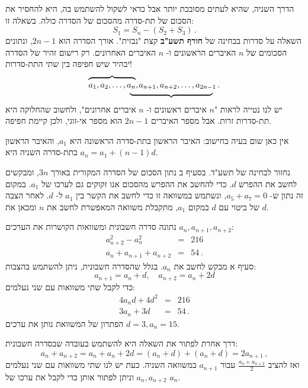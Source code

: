 \documentclass[12pt,a4paper]{article}
\begin{document}
הדרך השניה, שהיא לעתים מסובכת יותר אבל כדאי לשקול להשתמש בה, היא להחסיר את הסכום של תת-סדרה מהסכום של הסדרה כולה. בשאלה זו:
\[
S_1 = S_n - (S_2+S_3)\,.
\]
השאלה על סדרות בבחינה של
\textbf{חורף תשע"ב}
קצת "נבזית". אורך הסדרה הוא
$2n-1$,
ונתונים הסכומים של
$n$
האיברים הראשונים ו-%
$n$
האיברים האחרונים. רק רישום זהיר של הסדרה יבהיר שיש חפיפה בין שתי התת-סדרות!
\[
\renewcommand{\arraystretch}{.4}
\begin{array}{ll}
\overbrace{\rule{0pt}{8pt}a_1, a_2, \ldots, a_n},&\hspace{-9pt}a_{n+1}, a_{n+2}, \ldots, a_{2n-1}\,.\\
&\hspace{-2em}\underbrace{\rule{10em}{0pt}}
\end{array}
\]
יש לנו נטייה לראות 
"$n$
איברים ראשונים ו-%
$n$
איברים אחרונים", ולחשוב שהחלוקה היא תת-סדרות זרות. אבל מספר האיברים
$2n-1$
הוא מספר אי-זוגי, ולכן קיימת חפיפה.

אין כאן שום בעיה בחישוב: האיבר הראשון בתת-סדרה הראשונה היא
$a_1$,
והאיבר הראשון בתת-סדרה השניה היא
$a_n=a_1+(n-1)d$.

נחזור לבחינה של תשע"ד. בסעיף ב נתון הסכום של הסדרה המקורית באורך
$3n$,
ומבקשים לחשב את ההפרש
$d$.
כדי להחשב את ההפרש מהסכום אנו זקוקים גם לערכו של
$a_1$.
במקום זה נתון ש-%
$a_5+a_7=0$,
ונשתמש במשוואה זו כדי לחשב את הקשר בין
$a_1$
ל-%
$d$.
לאחר הצבה של ביטוי עם
$d$
במקום
$a_1$,
מתקבלת משוואה המאפשרת לחשב את
$n$
ומכאן את
$d$.


\bigskip

\textbf{}
נתונה סדרה חשבונית ומשוואות הקושרות את הערכים
$a_n, a_{n+1}, a_{n+2}$:
\begin{eqnarray*}
a_{n+2}^2 - a_n^2 &=&216\\
a_n+a_{n+1}+a_{n+2}&=&54\,.
\end{eqnarray*}
סעיף א מבקש לחשב את
$a_n$.
בגלל שהסדרה חשבונית, ניתן להשתמש בהצבות:
\[
a_{n+1}=a_n+d, \quad a_{n+2}=a_n+2d
\]
כדי לקבל שתי משוואות עם שני נעלמים:
\begin{eqnarray*}
4a_nd+4d^2 &=& 216\\
3a_n + 3d &=& 54\,.
\end{eqnarray*}
הפתרון של המשוואת נותן את ערכים
$d=3,a_n=15$.

דרך אחרת לפתור את השאלה היא להשתמש בעובדה שבסדרה חשבונית:
\[
a_n+a_{n+2} = a_n+a_n+2d = (a_n+d)+(a_n+d) = 2a_{n+1}\,,
\]
ואז להציב 
$\frac{a_n+a_{n+2}}{2}$
עבור
$a_{n+1}$
במשוואה השניה. כעת יש לנו שתי משוואות עם שני נעלמים
$a_n,a_{n+2}$
וניתן לפתור אותן כדי לקבל את ערכו של
$a_n$.
\end{document}
